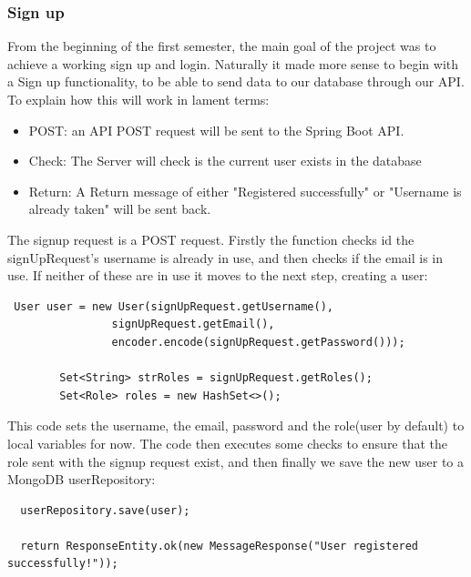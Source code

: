 \subsubsection{Sign up}
From the beginning of the first semester, the main goal of the project was to achieve a working sign up and login. Naturally it made more sense to begin with a Sign up functionality, to be able to send data to our database through our API. To explain how this will work in lament terms:
\begin{itemize}
    \item POST: an API POST request will be sent to the Spring Boot API.
    \item Check: The Server will check is the current user exists in the database
    \item Return: A Return message of either "Registered successfully" or "Username is already taken" will be sent back.
\end{itemize}
\par The signup request is a POST request. Firstly the function checks id the signUpRequest's username is already in use, and then checks if the email is in use. If neither of these are in use it moves to the next step, creating a user: \par
\begin{verbatim}
 User user = new User(signUpRequest.getUsername(),
                signUpRequest.getEmail(),
                encoder.encode(signUpRequest.getPassword()));

        Set<String> strRoles = signUpRequest.getRoles();
        Set<Role> roles = new HashSet<>();
\end{verbatim}
\par This code sets the username, the email, password and the role(user by default) to local variables for now. The code then executes some checks to ensure that the role sent with the signup request exist, and then finally we save the new user to a MongoDB userRepository: \par
\begin{verbatim}
  userRepository.save(user);

  return ResponseEntity.ok(new MessageResponse("User registered successfully!"));
\end{verbatim}


